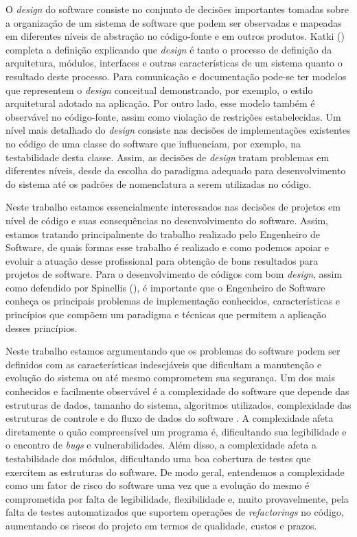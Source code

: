 O \emph{design} do software consiste no conjunto de decisões importantes tomadas sobre a organização de um sistema de software que podem ser observadas e mapeadas em diferentes níveis de abstração no código-fonte e em outros produtos.
%
Katki (\citeyear{katki1991}) completa a definição explicando que \emph{design} é tanto o processo de definição da arquitetura, módulos, interfaces e outras características de um sistema quanto o resultado deste processo.
%
Para comunicação e documentação pode-se ter modelos que representem o \emph{design} conceitual demonstrando, por exemplo, o estilo arquitetural adotado na aplicação.
%
Por outro lado, esse modelo também é observável no código-fonte, assim como violação de restrições estabelecidas. Um nível mais detalhado do \emph{design} consiste nas decisões de implementações existentes no código de uma classe do software que influenciam, por exemplo, na testabilidade desta classe. Assim, as decisões de \emph{design} tratam problemas em diferentes níveis, desde da escolha do paradigma adequado para desenvolvimento do sistema até os padrões de nomenclatura a serem utilizadas no código.


Neste trabalho estamos essencialmente interessados nas decisões de projetos em nível de código e suas consequências no desenvolvimento do software.
%
Assim, estamos tratando principalmente do trabalho realizado pelo Engenheiro de Software, de quais formas esse trabalho é realizado e como podemos apoiar e evoluir a atuação desse profissional para obtenção de bons resultados para projetos de software.
%
Para o desenvolvimento de códigos com bom \emph{design}, assim como defendido por Spinellis (\citeyear{spinellis2006}), é importante que o Engenheiro de Software conheça os principais problemas de implementação conhecidos, características e princípios que compõem um paradigma e técnicas que permitem a aplicação desses princípios.

%

Neste trabalho estamos argumentando que os problemas do software podem ser definidos com as características indesejáveis que dificultam a manutenção e evolução do sistema ou até mesmo comprometem sua segurança.
%
Um dos mais conhecidos e facilmente observável é a complexidade do software que depende das estruturas de dados, tamanho do sistema, algoritmos utilizados, complexidade das estruturas de controle e do fluxo de dados do software \cite{basili1983}.
%
A complexidade afeta diretamente o quão compreensível um programa é, dificultando sua legibilidade e o encontro de \emph{bugs} e vulnerabilidades.
%
Além disso, a complexidade afeta a testabilidade dos módulos, dificultando uma boa cobertura de testes que exercitem as estruturas do software.
%
De modo geral, entendemos a complexidade como um fator de risco do software uma vez que a evolução do mesmo é comprometida por falta de legibilidade, flexibilidade e, muito provavelmente, pela falta de testes automatizados que suportem operações de \emph{refactorings} no código, aumentando os riscos do projeto em termos de qualidade, custos e prazos.


